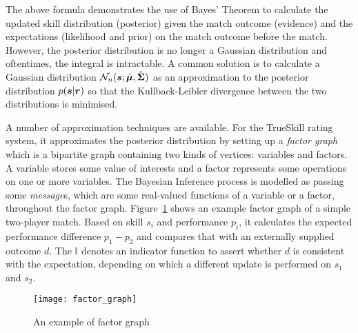 The above formula demonstrates the use of Bayes' Theorem to calculate the updated skill distribution (posterior) given the match outcome (evidence) and the expectations (likelihood and prior) on the match outcome before the match. However, the posterior distribution is no longer a Gaussian distribution and oftentimes, the integral is intractable. A common solution is to calculate a Gaussian distribution $\mathcal{N}_{n}(\bm{s}; \hat{\bm{\mu}}, \hat{\bm{\Sigma}})$ as an approximation to the posterior distribution $p(\bm{s} | \bm{r})$ so that the Kullback-Leibler divergence between the two distributions is minimised. 

A number of approximation techniques are available. For the TrueSkill rating system, it approximates the posterior distribution by setting up a \emph{factor graph} which is a bipartite graph containing two kinds of vertices: variables and factors. A variable stores some value of interests and a factor represents some operations on one or more variables. The Bayesian Inference process is modelled as passing some \emph{message}s, which are some real-valued functions of a variable or a factor, throughout the factor graph. Figure~\ref{Fig:fact_grph} shows an example factor graph of a simple two-player match. Based on skill $s_{i}$ and performance $p_{i}$, it calculates the expected performance difference $p_{1} - p_{2}$ and compares that with an externally supplied outcome $d$. The $\mathbb{I}$ denotes an indicator function to assert whether $d$ is consistent with the expectation, depending on which a different update is performed on $s_{1}$ and $s_{2}$. 

\begin{figure}[h!]
\texttt{[image: factor\_graph]}
\centering
\caption{An example of factor graph}\label{Fig:fact_grph}
\end{figure}


